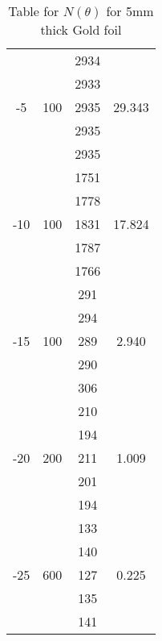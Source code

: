 \begin{table}[h]
\begin{tabular}{|c|c|c|c|}
	\multirow{5}{*}{-5} & \multirow{5}{*}{100} & 2934 & \multirow{5}{*}{29.343} \\ \cline{3-3}
	 &  & 2933 &  \\ \cline{3-3}
	 &  & 2935 &  \\ \cline{3-3}
	 &  & 2935 &  \\ \cline{3-3}
	 &  & 2935 &  \\ \hline
	\multirow{5}{*}{-10} & \multirow{5}{*}{100} & 1751 & \multirow{5}{*}{17.824} \\ \cline{3-3}
	 &  & 1778 &  \\ \cline{3-3}
	 &  & 1831 &  \\ \cline{3-3}
	 &  & 1787 &  \\ \cline{3-3}
	 &  & 1766 &  \\ \hline
	\multirow{5}{*}{-15} & \multirow{5}{*}{100} & 291 & \multirow{5}{*}{2.940} \\ \cline{3-3}
	 &  & 294 &  \\ \cline{3-3}
	 &  & 289 &  \\ \cline{3-3}
	 &  & 290 &  \\ \cline{3-3}
	 &  & 306 &  \\ \hline
	\multirow{5}{*}{-20} & \multirow{5}{*}{200} & 210 & \multirow{5}{*}{1.009} \\ \cline{3-3}
	 &  & 194 &  \\ \cline{3-3}
	 &  & 211 &  \\ \cline{3-3}
	 &  & 201 &  \\ \cline{3-3}
	 &  & 194 &  \\ \hline
	\multirow{5}{*}{-25} & \multirow{5}{*}{600} & 133 & \multirow{5}{*}{0.225} \\ \cline{3-3}
	 &  & 140 &  \\ \cline{3-3}
	 &  & 127 &  \\ \cline{3-3}
	 &  & 135 &  \\ \cline{3-3}
	 &  & 141 &  \\ \hline
	\end{tabular}
	\caption{Table for $N(\theta)$ for 5mm thick Gold foil}
	\label{tab:1}
\end{table}